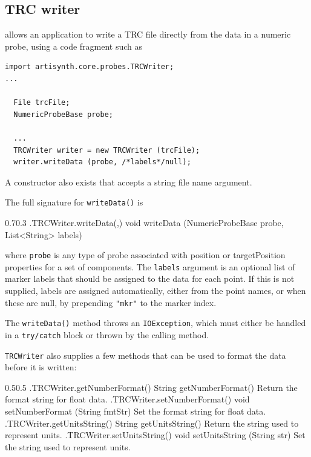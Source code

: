\subsection{TRC writer}
\label{TRCWriter:sec}

 allows an application to write a TRC file
directly from the data in a numeric probe, using a code fragment such as
%
\begin{lstlisting}[]
import artisynth.core.probes.TRCWriter;
...

  File trcFile;
  NumericProbeBase probe;

  ...
  TRCWriter writer = new TRCWriter (trcFile);
  writer.writeData (probe, /*labels*/null);
\end{lstlisting}
%
A constructor also exists that accepts a string file name argument.

The full signature for {\tt writeData()} is
%
\begin{methodtable}{0.7}{0.3}
%
\methodentry
{\probes.TRCWriter.writeData(,)}%
{void writeData (NumericProbeBase probe, List<String> labels)}%
{\ }%
%
\end{methodtable}
%
where {\tt probe} is any type of probe associated with {\sf position} or {\sf
targetPosition} properties for a set of  components.
The {\tt labels} argument is an optional list of marker labels that should be
assigned to the data for each point. If this is not supplied, labels are
assigned automatically, either from the point names, or when these are null, by
prepending {\tt "mkr"} to the marker index.

\begin{sideblock}
The {\tt writeData()} method throws an {\tt IOException}, which must either be
handled in a {\tt try/catch} block or thrown by the calling method.
\end{sideblock}

{\tt TRCWriter} also supplies a few methods that can be used
to format the data before it is written:
%
\begin{methodtable}{0.5}{0.5}
\midline
%
\methodentry
{\probes.TRCWriter.getNumberFormat()}%
{String getNumberFormat()}%
{Return the format string for float data.}%
%
\methodentry
{\probes.TRCWriter.setNumberFormat()}%
{void setNumberFormat (String fmtStr)}%
{Set the format string for float data.}%
%
\methodentry
{\probes.TRCWriter.getUnitsString()}%
{String getUnitsString()}%
{Return the string used to represent units.}%
%
\methodentry
{\probes.TRCWriter.setUnitsString()}%
{void setUnitsString (String str)}%
{Set the string used to represent units.}%
%
\midline
\end{methodtable}
%

